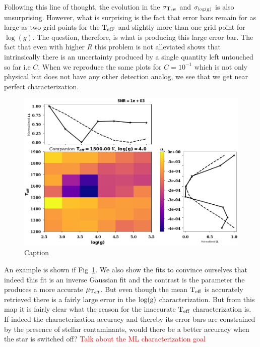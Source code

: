 Following this line of thought, the evolution in the $\sigma_{\rm{T_{eff}}}$ and $\sigma_{\rm{\log(g)}}$ is also unsurprising.
However, what is surprising is the fact that error bars remain for as large as two grid points for the $\rm{T_{efF}}$ and slightly more than one grid point for $\log(g)$.
The question, therefore, is what is producing this large error bar. 
The fact that even with higher $R$ this problem is not alleviated shows that intrinsically there is an uncertainty produced by a single quantity left untouched so far i.e $C$.
When we reproduce the same plots for $C=10^{-1}$ which is not only physical but does not have any other detection analog, we see that we get near perfect characterization.
\begin{figure}[!ht]
    \centering
    \includegraphics[scale=0.5]{images/Chapter3/char_fits_0.png}
    \caption{Caption}
    \label{fig:perfectchar}
\end{figure}
An example is shown if Fig~\ref{fig:perfectchar}.
We also show the fits to convince ourselves that indeed this fit is an inverse Gaussian fit and the contrast is the parameter the produces a more accurate $\mu_{\rm{T_{eff}}}$.
But even though the mean $\rm{T_{eff}}$ is accurately retrieved there is a fairly large error in the $\log(\rm{g})$ characterization.
But from this map it is fairly clear what the reason for the inaccurate $\rm{T_{eff}}$ characterization is.
If indeed the characterization accuracy and thereby its error bars are constrained by the presence of stellar contaminants, would there be a better accuracy when the star is switched off?
\textcolor{red}{Talk about the ML characterization goal}
